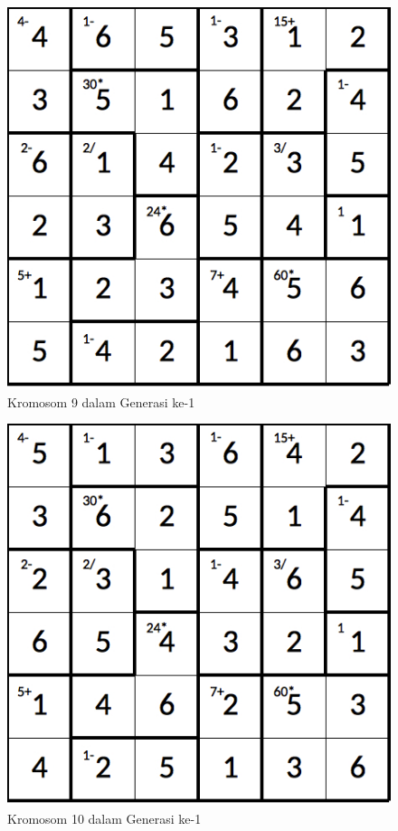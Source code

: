 \begin{figure}
\centering
\captionsetup{justification=centering}
\includegraphics[scale=0.333]{Gambar/hybridgenetic/Generation1Chromosome9}
\caption[Kromosom 9 dalam Generasi ke-1]{Kromosom 9 dalam Generasi ke-1}
\label{fig:analisisg1k9}
\end{figure}

\begin{figure}
\centering
\captionsetup{justification=centering}
\includegraphics[scale=0.333]{Gambar/hybridgenetic/Generation1Chromosome10}
\caption[Kromosom 10 dalam Generasi ke-1]{Kromosom 10 dalam Generasi ke-1}
\label{fig:analisisg1k10}
\end{figure}

